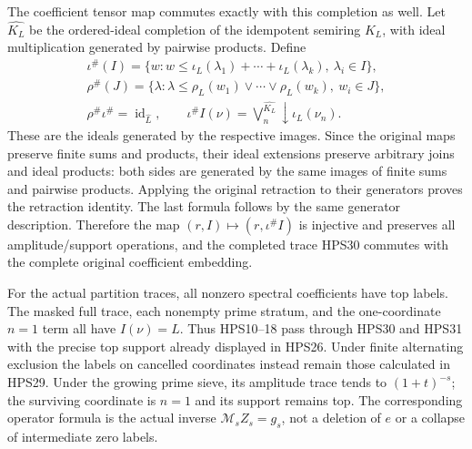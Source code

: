 The coefficient tensor map commutes exactly
with this completion as well. Let
$\widehat{K_L}$ be the ordered-ideal
completion of the idempotent semiring
$K_L$, with ideal multiplication generated
by pairwise products. Define
\begin{equation}\tag{HPS31}
\begin{gathered}
 \iota^\#(I)=
    \{w:w\le\iota_L(\lambda_1)+\cdots+
                         \iota_L(\lambda_k),\ \lambda_i\in I\},\\
 \rho^\#(J)=
    \{\lambda:\lambda\le\rho_L(w_1)\vee\cdots
                            \vee\rho_L(w_k),\ w_i\in J\},\\
 \rho^\#\iota^\#=\operatorname{id}_{\widehat L},\qquad
 \iota^\# I(\nu)
           =\bigvee_n^{\widehat{K_L}}
                            \downarrow\iota_L(\nu_n).
\end{gathered}
\end{equation}
These are the ideals generated by the
respective images. Since the original
maps preserve finite sums and products,
their ideal extensions preserve arbitrary
joins and ideal products: both sides are
generated by the same images of finite
sums and pairwise products.
Applying the original retraction to
their generators proves the retraction
identity. The last formula follows by
the same generator description.
Therefore the map
$(r,I)\mapsto(r,\iota^\# I)$ is injective
and preserves all amplitude/support
operations, and the completed trace
HPS30 commutes with the complete original
coefficient embedding.

For the actual partition traces, all
nonzero spectral coefficients have top
labels. The masked full trace, each
nonempty prime stratum, and the
one-coordinate $n=1$ term all have
$I(\nu)=L$. Thus HPS10--18 pass through
HPS30 and HPS31 with the precise top
support already displayed in HPS26.
Under finite alternating exclusion the
labels on cancelled coordinates instead
remain those calculated in HPS29.
Under the growing prime sieve, its
amplitude trace tends to $(1+t)^{-s}$;
the surviving coordinate is $n=1$ and
its support remains top. The corresponding
operator formula is the actual inverse
$\mathcal M_sZ_s=g_s$, not a deletion
of $e$ or a collapse of intermediate
zero labels.

